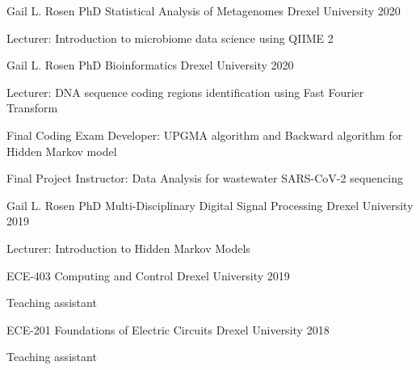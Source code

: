 



\begin{cventries}

\cventry
    {Gail L. Rosen PhD}
    {Statistical Analysis of Metagenomes}
    {Drexel University}
    {2020}
    {\begin{cvitems}
        \item Lecturer: Introduction to microbiome data science using QIIME 2
    \end{cvitems}}
    
\cventry
    {Gail L. Rosen PhD}
    {Bioinformatics}
    {Drexel University}
    {2020}
    {\begin{cvitems}
        \item Lecturer: DNA sequence coding regions identification using Fast Fourier Transform
        \item Final Coding Exam Developer: UPGMA algorithm and Backward algorithm for Hidden Markov model
        \item Final Project Instructor: Data Analysis for wastewater SARS-CoV-2 sequencing
    \end{cvitems}}    
    
\cventry
    {Gail L. Rosen PhD}
    {Multi-Disciplinary Digital Signal Processing}
    {Drexel University}
    {2019}
    {\begin{cvitems}
        \item Lecturer: Introduction to Hidden Markov Models
    \end{cvitems}}

\cventry
    {ECE-403}
    {Computing and Control}
    {Drexel University}
    {2019}
    {\begin{cvitems}
        \item Teaching assistant
    \end{cvitems}}
   
\cventry
    {ECE-201}
    {Foundations of Electric Circuits}
    {Drexel University}
    {2018}
    {\begin{cvitems}
        \item Teaching assistant
    \end{cvitems}}
    

\end{cventries}
